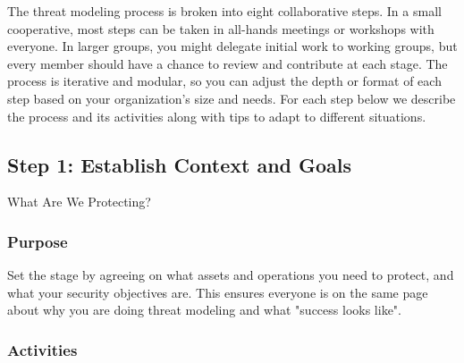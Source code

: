 The threat modeling process is broken into eight collaborative steps. In a small
cooperative, most steps can be taken in all-hands meetings or workshops with
everyone. In larger groups, you might delegate initial work to
working groups, but every member should have a chance to review and contribute
at each stage. The process is iterative and modular, so you can adjust the depth
or format of each step based on your organization's size and needs. For each
step below we describe the process and its activities
along with tips to adapt to different situations.

\subsection{Step 1: Establish Context and Goals}
\label{subsec:Step1}

What Are We Protecting?

\subsubsection{Purpose}

Set the stage by agreeing on what assets and operations you need to protect, and
what your security objectives are. This ensures everyone is on the same page
about why you are doing threat modeling and what "success looks like". 

\subsubsection{Activities}

